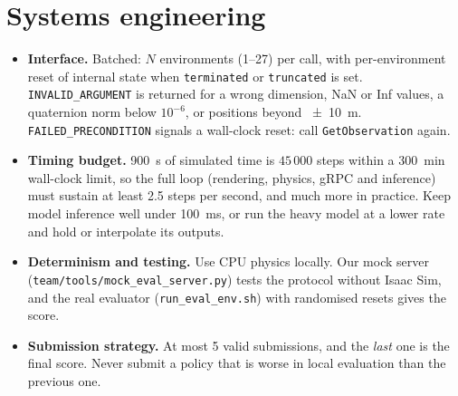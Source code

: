 \documentclass[10pt,a4paper]{article}
\begin{document}
\section{Systems engineering}
\begin{itemize}
\item \textbf{Interface.} Batched: $N$ environments (1--27) per call, with per-environment reset of internal state when \texttt{terminated} or \texttt{truncated} is set. \texttt{INVALID\_ARGUMENT} is returned for a wrong dimension, NaN or Inf values, a quaternion norm below $10^{-6}$, or positions beyond \SI{\pm10}{\metre}. \texttt{FAILED\_PRECONDITION} signals a wall-clock reset: call \texttt{GetObservation} again.
\item \textbf{Timing budget.} \SI{900}{\second} of simulated time is $45\,000$ steps within a \SI{300}{\minute} wall-clock limit, so the full loop (rendering, physics, gRPC and inference) must sustain at least 2.5 steps per second, and much more in practice. Keep model inference well under \SI{100}{\milli\second}, or run the heavy model at a lower rate and hold or interpolate its outputs.
\item \textbf{Determinism and testing.} Use CPU physics locally. Our mock server (\texttt{team/tools/mock\_eval\_server.py}) tests the protocol without Isaac Sim, and the real evaluator (\texttt{run\_eval\_env.sh}) with randomised resets gives the score.
\item \textbf{Submission strategy.} At most 5 valid submissions, and the \emph{last} one is the final score. Never submit a policy that is worse in local evaluation than the previous one.
\end{itemize}

\end{document}
